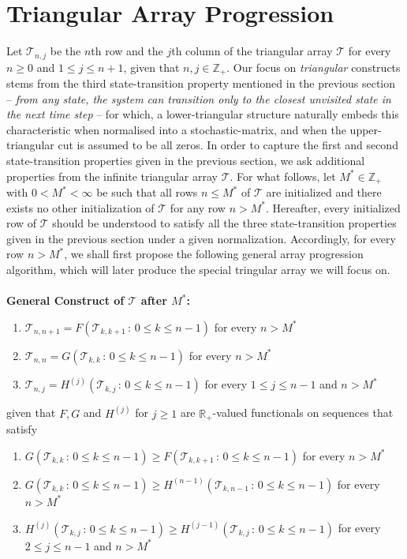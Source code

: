 \documentclass[a4paper,12pt]{article}
\def\R{\mathbb{R}}
\def\Z{\mathbb{Z}}
\def\T{\mathcal{T}}
\begin{document}
\section{Triangular Array Progression}
Let $\T_{n,j}$ be the $n$th row and the $j$th column of the triangular array $\T$ for every $n\geq 0$ and $1 \leq j \leq n+1$, given that $n,j \in \Z_+$. Our focus on \emph{triangular} constructs stems from the third state-transition property mentioned in the previous section -- \emph{from any state, the system can transition only to the closest unvisited state in the next time step} -- for which, a lower-triangular structure naturally embeds this characteristic when normalised into a stochastic-matrix, and when the upper-triangular cut is assumed to be all zeros. In order to capture the first and second state-transition properties given in the previous section, we ask additional properties from the infinite triangular array $\T$. For what follows, let $M^*\in \Z_+$ with $0 < M^* < \infty$ be such that all rows $n \leq M^*$ of $\T$ are initialized and there exists no other initialization of $\T$ for any row $n > M^*$. Hereafter, every initialized row of $\T$ should be understood to satisfy all the three state-transition properties given in the previous section under a given normalization. Accordingly, for every row $n > M^*$, we shall first propose the following general array progression algorithm, which will later produce the special tringular array we will focus on.
\\
\\
\textbf{General Construct of $\T$ after $M^*$:}
\begin{enumerate}
\label{algorithmgeneral}
\item $\T_{n,n+1} = F(\T_{k,k+1} \, : \, 0 \leq k \leq n - 1 )$ for every $n > M^*$
\item $\T_{n,n}   = G(\T_{k,k} \, : \, 0 \leq k \leq n - 1 )$ for every $n > M^*$
\item $\T_{n,j}   = H^{(j)}(\T_{k,j} \, : \, 0 \leq k \leq n - 1 )$ for every $1 \leq j \leq n-1$ and $n > M^*$ 
\end{enumerate}
given that $F,G$ and $H^{(j)}$ for $j\geq 1$ are $\R_+$-valued functionals on sequences that satisfy 
\begin{enumerate}
\label{functionalrelations}
\item $G(\T_{k,k} \, : \, 0 \leq k \leq n - 1 ) \geq F(\T_{k,k+1} \, : \, 0 \leq k \leq n - 1 )$ for every $n > M^*$
\item $G(\T_{k,k} \, : \, 0 \leq k \leq n - 1 ) \geq  H^{(n-1)}(\T_{k,n-1} \, : \, 0 \leq k \leq n - 1 )$ for every $n > M^*$
\item $H^{(j)}(\T_{k,j} \, : \, 0 \leq k \leq n - 1 ) \geq H^{(j-1)}(\T_{k,j} \, : \, 0 \leq k \leq n - 1 )$ for every $2 \leq j \leq n-1$ and $n > M^*$ 
\end{enumerate}
\end{document}
